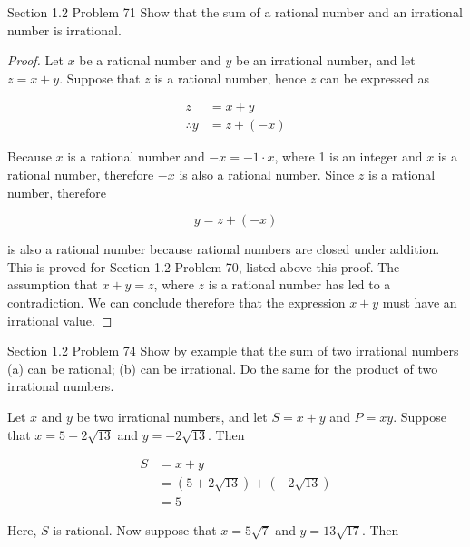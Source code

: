 \documentclass{article}
\begin{document}
    \begin{tbhtheorem}{Section 1.2 Problem 71}
        Show that the sum of a rational number and an irrational number is irrational.
    \end{tbhtheorem}

    \begin{proof}
    \noindent Let $x$ be a rational number and $y$ be an irrational number, and let $z=x+y$. Suppose that $z$ is a rational number, hence $z$ can be expressed as

    \begin{align*}
        z            &= x + y \\
        \therefore y &= z + (-x)
    \end{align*}

    \noindent Because $x$ is a rational number and $-x=-1\cdot x$, where 1 is an integer and $x$ is a rational number, therefore $-x$ is also a rational number. Since $z$ is a rational number, therefore

    \[
        y = z + (-x)
    \]

    \noindent is also a rational number because rational numbers are closed under addition. This is proved for  Section 1.2 Problem 70, listed above this proof. The assumption that $x+y=z$, where $z$ is a rational number
    has led to a contradiction. We can conclude therefore that the expression $x+y$ must have an irrational value.

    \end{proof}



    \begin{tbhtheorem}{Section 1.2 Problem 74}
        Show by example that the sum of two irrational numbers (a) can be rational; (b) can be irrational. Do the same for the product of two irrational numbers.
    \end{tbhtheorem}

     Let $x$ and $y$ be two irrational numbers, and let $S=x+y$ and $P=xy$. Suppose that $x=5 + 2\sqrt{13}$ and $y=-2\sqrt{13}$. Then

        \begin{align*}
            S   &= x + y \\
                &= (5+2\sqrt{13}) + (-2\sqrt{13}) \\
                &= 5
        \end{align*}

        \noindent Here, $S$ is rational. Now suppose that $x=5\sqrt{7}$ and $y=13\sqrt{17}$. Then
\end{document}
